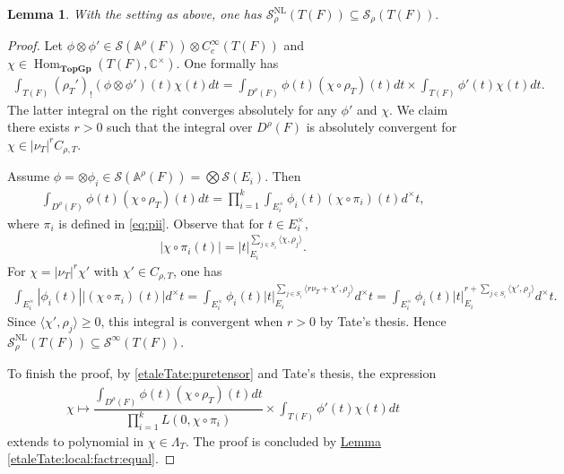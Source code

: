 \documentclass[10pt]{amsart}
\newtheorem{lemma}[theorem]{Lemma}
\theoremstyle{definition}
\numberwithin{equation}{section}
\DeclareMathOperator{\Hom}{\mathrm{Hom}}
\numberwithin{equation}{subsection}
\begin{document}
\begin{lemma}\label{SNL:in:Srho} With the setting as above, one has $
\mathcal{S}^{\mathrm{NL}}_\rho(T(F))\subseteq\mathcal{S}_\rho(T(F)).$
\end{lemma}
\begin{proof} 
Let $\phi\otimes \phi'\in \mathcal{S}(\mathbb{A}^\rho(F))\otimes C^\infty_c(T(F))$ and $\chi\in\Hom_{\mathbf{TopGp}}(T(F),\mathbb{C}^\times).$ One formally has
\begin{align}\label{etaleTate:zeta:decomp}
    \int_{T(F)} (\rho_T')_!(\phi \otimes \phi')(t) \chi(t) dt = \int_{D^\rho(F)} \phi(t)(\chi\circ\rho_T)(t)dt \times \int_{T(F)} \phi'(t)\chi(t) dt.
\end{align}
The latter integral on the right converges absolutely for any $\phi'$ and $\chi$. We claim there exists $r>0$ such that the integral over $D^\rho(F)$ is absolutely convergent for $\chi\in |\nu_T|^rC_{\rho,T}$. 



Assume $\phi=\otimes\phi_i\in\mathcal{S}(\mathbb{A}^\rho(F)) = \bigotimes\mathcal{S}(E_i)$. Then
\begin{align}\label{etaleTate:puretensor}
    \int_{D^\rho(F)} \phi(t)(\chi\circ\rho_T)(t) dt = \prod_{i=1}^k \int_{E_i^\times} \phi_i(t)(\chi\circ \pi_i)(t) d^\times t,
\end{align}
where $\pi_i$ is defined in \eqref{eq:pii}. Observe that for $t\in E_i^\times,$ 
\begin{align*}
    |\chi\circ \pi_i (t)| = |t|_{E_i}^{\sum_{j\in S_i}\langle\chi,\rho_j\rangle}.
\end{align*}
For $\chi = |\nu_T|^r\chi'$ with $\chi'\in C_{\rho,T}$, one has
\begin{align*}
    \int_{E_i^\times} |\phi_i(t)||(\chi\circ \pi_i)(t)| d^\times t = \int_{E_i^\times} \phi_i(t) |t|_{E_i}^{\sum_{j\in S_i}\langle r\nu_T + \chi',\rho_j\rangle} d^\times t = \int_{E_i^\times} \phi_i(t) |t|_{E_i}^{r + \sum_{j\in S_i}\langle\chi',\rho_j\rangle} d^\times t.
\end{align*}
Since $\langle\chi',\rho_j\rangle\geq 0$, this integral is convergent when $r>0$ by Tate's thesis. Hence $\mathcal{S}^{\mathrm{NL}}_\rho(T(F))\subseteq \mathcal{S}^\infty(T(F))$.

To finish the proof, by \eqref{etaleTate:puretensor} and Tate's thesis, the expression
\begin{align*}
    \chi\mapsto \dfrac{\displaystyle\int_{D^\rho(F)} \phi(t)(\chi\circ\rho_T)(t) dt}{\prod\limits_{i=1}^k L(0,\chi\circ \pi_i)}\times \int_{T(F)} \phi'(t)\chi(t) dt
\end{align*}
extends to polynomial in $\chi\in\Lambda_T$. The proof is concluded by \hyperref[etaleTate:local:factr:equal]{Lemma \ref{etaleTate:local:factr:equal}}. 
\end{proof}
\end{document}
